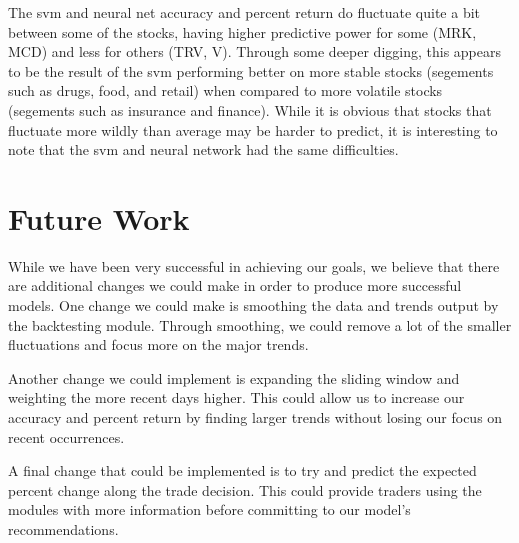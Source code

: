 \documentclass{article}
\begin{document}
The svm and neural net accuracy and percent return do fluctuate quite a bit between some of the stocks, having higher predictive power for some (MRK, MCD) and less for others (TRV, V). Through some deeper digging, this appears to be the result of the svm performing better on more stable stocks (segements such as drugs, food, and retail) when compared to more volatile stocks (segements such as insurance and finance). While it is obvious that stocks that fluctuate more wildly than average may be harder to predict, it is interesting to note that the svm and neural network had the same difficulties.

\section{Future Work}
While we have been very successful in achieving our goals, we believe that there are additional changes we could make in order to produce more successful models. One change we could make is smoothing the data and trends output by the backtesting module. Through smoothing, we could remove a lot of the smaller fluctuations and focus more on the major trends.

Another change we could implement is expanding the sliding window and weighting the more recent days higher. This could allow us to increase our accuracy and percent return by finding larger trends without losing our focus on recent occurrences.

A final change that could be implemented is to try and predict the expected percent change along the trade decision. This could provide traders using the modules with more information before committing to our model's recommendations.
\end{document}
